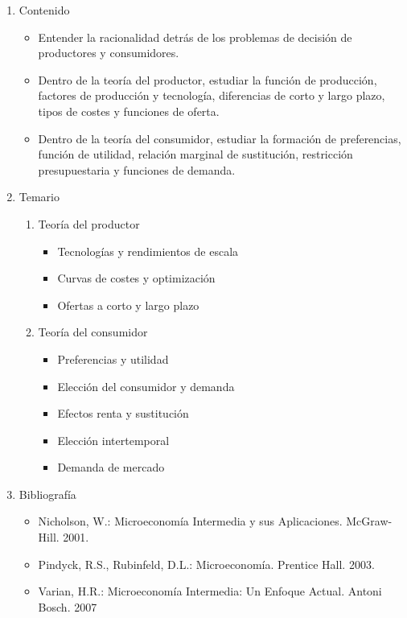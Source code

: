 \documentclass{article}\usepackage[]{graphicx}\usepackage[]{color}
\begin{document}
\begin{enumerate}
  \item Contenido
    \begin{itemize}
      \item Entender la racionalidad detrás de los problemas de decisión de productores y consumidores.
      \item Dentro de la teoría del productor, estudiar la función de producción, factores de producción y tecnología, diferencias de corto y largo plazo, tipos de costes y funciones de oferta.
      \item Dentro de la teoría del consumidor, estudiar la formación de preferencias, función de utilidad, relación marginal de sustitución, restricción presupuestaria y funciones de demanda.
\end{itemize}

  \item Temario
    \begin{enumerate}
      \item Teoría del productor
        \begin{itemize}
          \item Tecnologías y rendimientos de escala
          \item Curvas de costes y optimización
          \item Ofertas a corto y largo plazo
        \end{itemize}
      \item Teoría del consumidor
        \begin{itemize}
          \item Preferencias y utilidad
          \item Elección del consumidor y demanda
          \item Efectos renta y sustitución
          \item Elección intertemporal
          \item Demanda de mercado
        \end{itemize}
    \end{enumerate}
  
  \item Bibliografía
    \begin{itemize}
      \item Nicholson, W.: Microeconomía Intermedia y sus Aplicaciones. McGraw-Hill. 2001.
      \item Pindyck, R.S., Rubinfeld, D.L.: Microeconomía. Prentice Hall. 2003.
      \item Varian, H.R.: Microeconomía Intermedia: Un Enfoque Actual. Antoni Bosch. 2007
  \end{itemize}
\end{enumerate}
\end{document}
